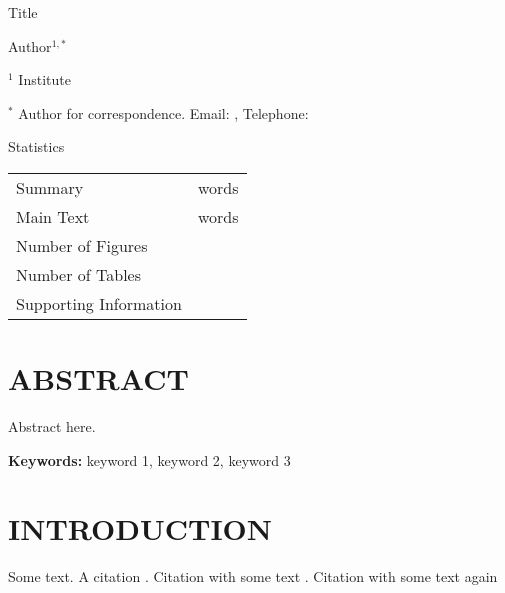 \documentclass[letterpaper,12pt]{article}
\begin{document}
\setlength{\abovedisplayskip}{0pt}
\setlength{\belowdisplayskip}{0pt}




{
\centering
\par \noindent Title
\par \noindent Author$^{1,*}$

\flushleft
\par \noindent $^{1}$ Institute
\par \noindent $^{*}$ Author for correspondence. Email: , Telephone:

%
%
%
%

\begin{center}
\par Statistics

\begin{tabular}{lr}
\hline
Summary					& words\\
Main Text				& words\\
\hline
Number of Figures		&\\
Number of Tables		&\\
Supporting Information	&\\
\hline
\end{tabular}
\end{center}
}




\clearpage
\section*{ABSTRACT}
\par Abstract here.

\par \noindent \textbf{Keywords:} keyword 1, keyword 2, keyword 3




\clearpage
\section{INTRODUCTION}
\par Some text. A citation \citep{wang2015stem}. Citation with some text \citep[here is some text before the citation;][]{wang2015stem}. Citation with some text again \citep[][some text after the citation]{holtta2017steady}
\end{document}
